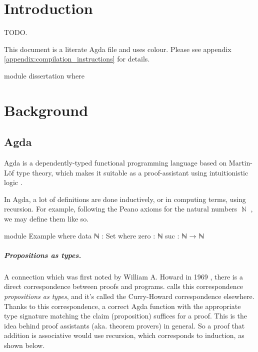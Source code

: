 \documentclass[logo,bsc,singlespacing,parskip,online]{infthesis}
\DeclareMathOperator{\nat}{\mathbb{N}}
\renewenvironment{code}{\mintedcopy[breaklines,breaksymbolleft=\;]{agda}}{\endmintedcopy}
\begin{document}
\chapter{Introduction}

TODO.

This document is a literate Agda file and uses {\color{violet}colour}. Please see appendix
\ref{appendix:compilation_instructions} for details.

\begin{code}
module dissertation where
\end{code}

\chapter{Background}

\section{Agda}
Agda is a dependently-typed functional programming language based on Martin-Löf type theory, which
makes it suitable as a proof-assistant using intuitionistic logic \citep{norell_towards_2007}.

In Agda, a lot of definitions are done inductively, or in computing terms, using recursion. For
example, following the Peano axioms for the natural numbers $\nat$ \citep{boolos_freges_1995}, we
may define them like so.

\begin{code}
module Example where
  data ℕ : Set where
    zero : ℕ
    suc  : ℕ → ℕ
\end{code}


\paragraph*{Propositions as types.} A connection which was first noted by William A. Howard in 1969
\citep{howard_formulae-as-types_1980}, there is a direct correspondence between proofs and programs.
\citet{wadler_propositions_2015} calls this correspondence \textit{propositions as types}, and it's
called the Curry-Howard correspondence elsewhere. Thanks to this correspondence, a correct Agda
function with the appropriate type signature matching the claim (proposition) suffices for a proof.
This is the idea behind proof assistants (aka. theorem provers) in general. So a proof that addition
is associative would use recursion, which corresponds to induction, as shown below.
\end{document}
